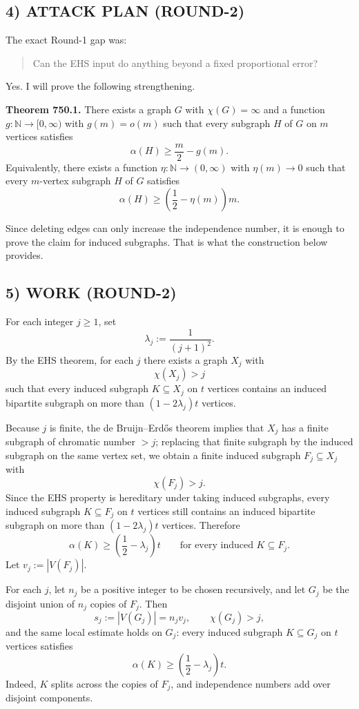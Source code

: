 \subsection*{4) ATTACK PLAN (ROUND-2)}

The exact Round-1 gap was:
\begin{quote}
Can the EHS input do anything beyond a fixed proportional error?
\end{quote}

Yes. I will prove the following strengthening.

\medskip
\noindent
\textbf{Theorem 750.1.}
There exists a graph $G$ with $\chi(G)=\infty$ and a function $g:\mathbb N\to[0,\infty)$ with $g(m)=o(m)$ such that every subgraph $H$ of $G$ on $m$ vertices satisfies
\[
\alpha(H)\ge \frac m2-g(m).
\]
Equivalently, there exists a function $\eta:\mathbb N\to(0,\infty)$ with $\eta(m)\to 0$ such that every $m$-vertex subgraph $H$ of $G$ satisfies
\[
\alpha(H)\ge \left(\frac12-\eta(m)\right)m.
\]

Since deleting edges can only increase the independence number, it is enough to prove the claim for induced subgraphs. That is what the construction below provides.

\subsection*{5) WORK (ROUND-2)}

For each integer $j\ge 1$, set
\[
\lambda_j:=\frac{1}{(j+1)^2}.
\]
By the EHS theorem, for each $j$ there exists a graph $X_j$ with
\[
\chi(X_j)>j
\]
such that every induced subgraph $K\subseteq X_j$ on $t$ vertices contains an induced bipartite subgraph on more than $(1-2\lambda_j)t$ vertices.

Because $j$ is finite, the de Bruijn--Erd\H{o}s theorem implies that $X_j$ has a finite subgraph of chromatic number $>j$; replacing that finite subgraph by the induced subgraph on the same vertex set, we obtain a finite induced subgraph $F_j\subseteq X_j$ with
\[
\chi(F_j)>j.
\]
Since the EHS property is hereditary under taking induced subgraphs, every induced subgraph $K\subseteq F_j$ on $t$ vertices still contains an induced bipartite subgraph on more than $(1-2\lambda_j)t$ vertices. Therefore
\[
\alpha(K)\ge \left(\frac12-\lambda_j\right)t
\qquad\text{for every induced }K\subseteq F_j.
\]
Let $v_j:=|V(F_j)|$.

For each $j$, let $n_j$ be a positive integer to be chosen recursively, and let $G_j$ be the disjoint union of $n_j$ copies of $F_j$. Then
\[
s_j:=|V(G_j)|=n_jv_j,
\qquad
\chi(G_j)>j,
\]
and the same local estimate holds on $G_j$: every induced subgraph $K\subseteq G_j$ on $t$ vertices satisfies
\[
\alpha(K)\ge \left(\frac12-\lambda_j\right)t.
\]
Indeed, $K$ splits across the copies of $F_j$, and independence numbers add over disjoint components.

